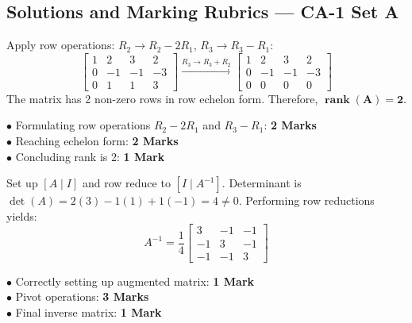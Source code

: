 
\newpage
\subsection*{Solutions and Marking Rubrics --- CA-1 Set A}

\begin{solutionbox}
Apply row operations: $R_2 \to R_2 - 2R_1$, $R_3 \to R_3 - R_1$:
\[
\begin{bmatrix} 1 & 2 & 3 & 2 \\ 0 & -1 & -1 & -3 \\ 0 & 1 & 1 & 3 \end{bmatrix} \xrightarrow{R_3 \to R_3 + R_2} \begin{bmatrix} 1 & 2 & 3 & 2 \\ 0 & -1 & -1 & -3 \\ 0 & 0 & 0 & 0 \end{bmatrix}
\]
The matrix has 2 non-zero rows in row echelon form. Therefore, $\mathbf{\operatorname{rank}(A) = 2}$.
\begin{markingrubric}
$\bullet$ Formulating row operations $R_2 - 2R_1$ and $R_3 - R_1$: \textbf{2 Marks}\\
$\bullet$ Reaching echelon form: \textbf{2 Marks}\\
$\bullet$ Concluding rank is 2: \textbf{1 Mark}
\end{markingrubric}
\end{solutionbox}

\begin{solutionbox}
Set up $[A \mid I]$ and row reduce to $[I \mid A^{-1}]$. Determinant is $\det(A) = 2(3) - 1(1) + 1(-1) = 4 \neq 0$.
Performing row reductions yields:
\[
A^{-1} = \frac{1}{4}\begin{bmatrix} 3 & -1 & -1 \\ -1 & 3 & -1 \\ -1 & -1 & 3 \end{bmatrix}
\]
\begin{markingrubric}
$\bullet$ Correctly setting up augmented matrix: \textbf{1 Mark}\\
$\bullet$ Pivot operations: \textbf{3 Marks}\\
$\bullet$ Final inverse matrix: \textbf{1 Mark}
\end{markingrubric}
\end{solutionbox}


